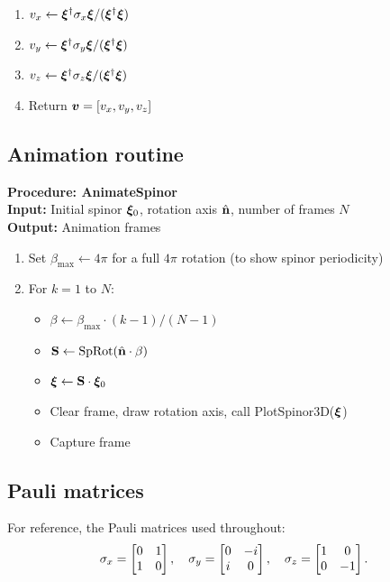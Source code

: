 \begin{enumerate}
\item $v_x \gets \bm{\xi}^\dagger {\sigma}_x \bm{\xi} / (\bm{\xi}^\dagger \bm{\xi})$
\item $v_y \gets \bm{\xi}^\dagger {\sigma}_y \bm{\xi} / (\bm{\xi}^\dagger \bm{\xi})$
\item $v_z \gets \bm{\xi}^\dagger {\sigma}_z \bm{\xi} / (\bm{\xi}^\dagger \bm{\xi})$
\item Return $\bm{v} = [v_x, v_y, v_z]$
\end{enumerate}

\subsection{Animation routine}

\medskip
\noindent\textbf{Procedure: AnimateSpinor}\\
\textbf{Input:} Initial spinor $\bm{\xi}_0$, rotation axis $\hat{\mathbf{n}}$, number of frames $N$\\
\textbf{Output:} Animation frames

\begin{enumerate}
\item Set $\beta_{\max} \gets 4\pi$ for a full $4\pi$ rotation (to show spinor periodicity)
\item For $k = 1$ to $N$:
\begin{itemize}
    \item $\beta \gets \beta_{\max} \cdot (k-1)/(N-1)$
    \item $\mathbf{S} \gets \mathrm{SpRot}(\hat{\mathbf{n}} \cdot \beta)$
    \item $\bm{\xi} \gets \mathbf{S} \cdot \bm{\xi}_0$
    \item Clear frame, draw rotation axis, call PlotSpinor3D($\bm{\xi}$)
    \item Capture frame
\end{itemize}
\end{enumerate}

\subsection{Pauli matrices}

For reference, the Pauli matrices used throughout:
\begin{equation}
{\sigma}_x = \begin{bmatrix} 0 & 1 \\ 1 & 0 \end{bmatrix}, \quad
{\sigma}_y = \begin{bmatrix} 0 & -i \\ i & 0 \end{bmatrix}, \quad
{\sigma}_z = \begin{bmatrix} 1 & 0 \\ 0 & -1 \end{bmatrix}.
\end{equation}
